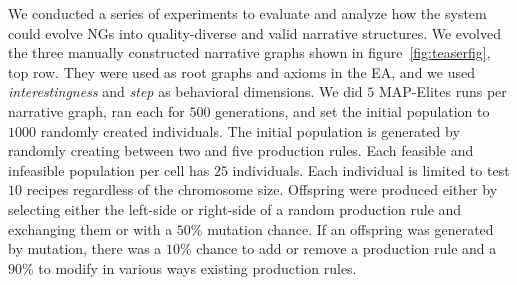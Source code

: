 \begin{table}[t]
\caption{Comparative results between root graphs and generated elites (shown in fig. \ref{fig:teaserfig})}
\label{tab:best-generated}
\end{table}



We conducted a series of experiments to evaluate and analyze how the system could evolve NGs into quality-diverse and valid narrative structures. We evolved the three manually constructed narrative graphs shown in figure~\ref{fig:teaserfig}, top row. They were used as root graphs and axioms in the EA, and we used \textit{interestingness} and \textit{step} as behavioral dimensions. We did $5$ MAP-Elites runs per narrative graph, ran each for $500$ generations, and set the initial population to $1000$ randomly created individuals. The initial population is generated by randomly creating between two and five production rules. Each feasible and infeasible population per cell has $25$ individuals. Each individual is limited to test $10$ recipes regardless of the chromosome size. Offspring were produced either by selecting either the left-side or right-side of a random production rule and exchanging them or with a $50$\% mutation chance. If an offspring was generated by mutation, there was a $10$\% chance to add or remove a production rule and a $90$\% to modify in various ways existing production rules.

